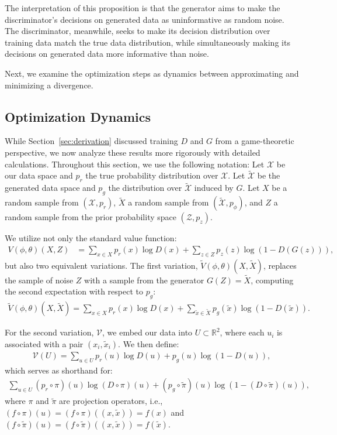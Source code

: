 The interpretation of this proposition is that the generator aims to make the discriminator's decisions on generated data as uninformative as random noise. The discriminator, meanwhile, seeks to make its decision distribution over training data match the true data distribution, while simultaneously making its decisions on generated data more informative than noise.

Next, we examine the optimization steps as dynamics between approximating and minimizing a divergence.

\subsection{Optimization Dynamics}%
\label{sec:optimization-dynamics}

While Section~\ref{sec:derivation} discussed training $D$ and $G$ from a game-theoretic perspective, we now analyze these results more rigorously with detailed calculations. Throughout this section, we use the following notation: Let $\mathcal{X}$ be our data space and $p_r$ the true probability distribution over $\mathcal{X}$. Let $\tilde{\mathcal{X}}$ be the generated data space and $p_g$ the distribution over $\tilde{\mathcal{X}}$ induced by $G$. Let $X$ be a random sample from $(\mathcal{X}, p_r)$, $\tilde{X}$ a random sample from $(\tilde{\mathcal{X}}, p_\phi)$, and $Z$ a random sample from the prior probability space $(\mathcal{Z}, p_z)$.

We utilize not only the standard value function:
\begin{align}
	V(\phi, \theta)(X, Z) & = \sum_{x \in X}p_r(x)\log{D(x)} +
	\sum_{z \in Z}p_z(z)\log{(1 - D(G(z)))},
\end{align}
but also two equivalent variations. The first variation, $\tilde{V}(\phi, \theta)(X, \tilde{X})$, replaces the sample of noise $Z$ with a sample from the generator $G(Z) = \tilde{X}$, computing the second expectation with respect to $p_g$:
\begin{align}
	\tilde{V}(\phi, \theta)(X, \tilde{X}) = \sum_{x \in X}p_r(x)\log{D(x)} + \sum_{\tilde{x} \in\tilde{X}}p_g(\tilde{x})\log{(1 - D(\tilde{x}))}.
\end{align}

For the second variation, $\mathcal{V}$, we embed our data into $U \subset \mathbb{R}^2$, where each $u_i$ is associated with a pair $(x_i, \tilde{x}_i)$. We then define:
\begin{align}
	\label{eq:joined}
	\mathcal{V}(U) = \sum_{u \in U} p_r(u) \log D(u) + p_g(u) \log(1 - D(u)),
\end{align}
which serves as shorthand for:
\begin{align}
	\label{eq:joined-verbose}
	\sum_{u \in U} (p_r \circ \pi)(u)\log (D \circ \pi)(u) + (p_g \circ \tilde{\pi})(u) \log(1 - (D \circ \tilde{\pi})(u)),
\end{align}
where $\pi$ and $\tilde{\pi}$ are projection operators, i.e., $(f \circ \pi)(u) = (f \circ \pi)((x, \tilde{x})) = f(x)$ and $(f \circ \tilde{\pi})(u) = (f \circ \tilde{\pi})((x, \tilde{x})) = f(\tilde{x})$.

